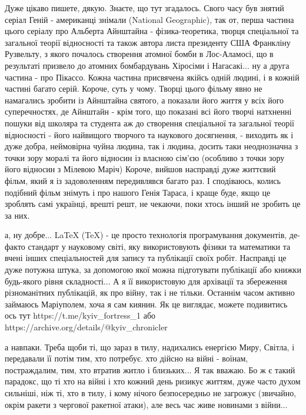  
 
 
 
 


Дуже цікаво пишете, дякую. Знаєте, що тут згадалось. Свого часу був знятий
серіал Геній - американці знімали (National Geographic), так от, перша частина
цього серіалу про Альберта Айнштайна - фізика-теоретика, творця спеціальної та
загальної теорії відносності та також автора листа президенту США Франкліну
Рузвельту, з якого почалось створення атомної бомби в Лос-Аламосі, що в
результаті призвело до атомних бомбардувань Хіросіми і Нагасакі... ну а друга
частина - про Пікассо. Кожна частина присвячена якійсь одній людині, і в кожній
частині багато серій. Короче, суть у чому. Творці цього фільму явно не
намагались зробити із Айнштайна святого, а показали його життя у всіх його
суперечностях, де Айнштайн - крім того, що показані всі його творчі натхненні
пошуки від школяра та студента аж до створення спеціальної та загальної теорії
відносності - його найвищого творчого та наукового досягнення, - виходить як і
дуже добра, неймовірна чуйна людина, так і людина, досить таки неоднозначна з
точки зору моралі та його відносин із власною сім'єю (особливо з точки зору
його відносин з Мілевою Маріч) Короче, вийшов насправді дуже життєвий фільм,
який я із задоволенням передивлявся багато раз. І сподіваюсь, колись подібний
фільм знімуть і про нашого Генія Тараса, і краще буде, якщо це зроблять самі
українці, врешті решт, не чекаючи, поки хтось інший не зробить це за них.


а, ну добре... LaTeX (TeX) - це просто технологія програмування документів,
де-факто стандарт у науковому світі, яку використовують фізики та математики та
вчені інших спеціальностей для запису та публікації своїх робіт. Насправді це
дуже потужна штука, за допомогою якої можна підготувати публікації або книжки
будь-якого рівня складності... А я її використовую для архівації та збереження
різноманітних публікацій, як про війну, так і не тільки. Останнім часом активно
займаюсь Маріуполем, хоча я сам киянин. Як це виглядає, можете подивитись ось
тут https://t.me/kyiv_fortress_1 або
https://archive.org/details/@kyiv_chronicler

а навпаки. Треба щоби ті, що зараз в тилу, надихались енергією Миру, Світла, і
передавали її потім тим, хто потребує. хто дійсно на війні - воїнам,
постраждалим, тим, хто втратив житло і близьких... Я так вважаю. Бо ж є такий
парадокс, що ті хто на війні і хто кожний день ризикує життям, дуже часто духом
сильніші, ніж ті, хто в тилу, і кому нічого безпосередньо не загрожує
(звичайно, окрім ракети з чергової ракетної атаки), але весь час живе новинами
з війни... 
